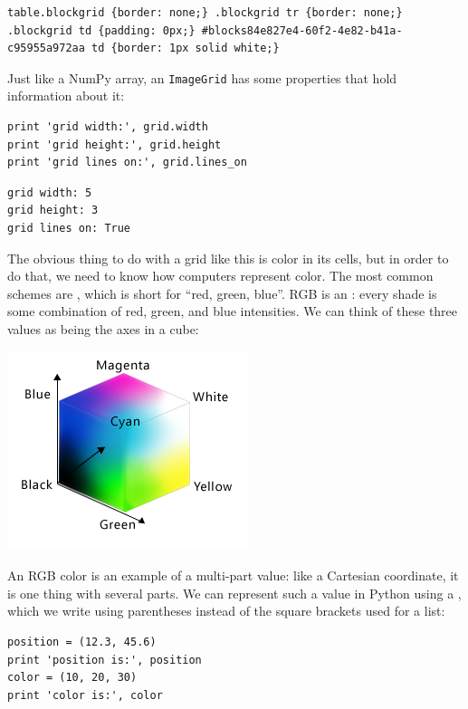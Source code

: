 \documentclass{book}
\begin{document}
\begin{verbatim}
table.blockgrid {border: none;} .blockgrid tr {border: none;} .blockgrid td {padding: 0px;} #blocks84e827e4-60f2-4e82-b41a-c95955a972aa td {border: 1px solid white;}
\end{verbatim}

Just like a NumPy array, an \texttt{ImageGrid} has some properties that
hold information about it:

\begin{verbatim}
print 'grid width:', grid.width
print 'grid height:', grid.height
print 'grid lines on:', grid.lines_on
\end{verbatim}

\begin{verbatim}
grid width: 5
grid height: 3
grid lines on: True
\end{verbatim}

The obvious thing to do with a grid like this is color in its cells, but
in order to do that, we need to know how computers represent color. The
most common schemes are , which is short for ``red,
green, blue''. RGB is an : every shade is some combination of red, green, and blue
intensities. We can think of these three values as being the axes in a
cube:

\includegraphics{novice/python/img/color-cube.png}

An RGB color is an example of a multi-part value: like a Cartesian
coordinate, it is one thing with several parts. We can represent such a
value in Python using a , which we write using
parentheses instead of the square brackets used for a list:

\begin{verbatim}
position = (12.3, 45.6)
print 'position is:', position
color = (10, 20, 30)
print 'color is:', color
\end{verbatim}
\end{document}
